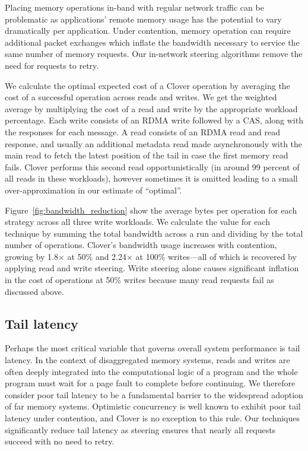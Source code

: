 Placing memory operations in-band with regular network traffic can be
problematic as applications' remote memory usage has the potential to
vary dramatically per application.  Under contention, memory operation
can require additional packet exchanges which inflate the bandwidth
necessary to service the same number of memory requests. Our
in-network steering algorithms remove the need for requests to
retry.


We calculate the optimal expected cost of a Clover operation by
averaging the cost of a successful operation across reads and
writes. We get the weighted average by multiplying the cost of a read
and write by the appropriate workload percentage. Each write consists
of an RDMA write followed by a CAS, along with the responses for each
message. A read consists of an RDMA read and read response, and
usually an additional metadata read made asynchronously with the main
read to fetch the latest position of the tail in case the first memory
read fails. Clover performs this second read opportunistically (in
around 99 percent of all reads in these workloads), however sometimes
it is omitted leading to a small over-approximation in our estimate of
``optimal''.

Figure~\ref{fig:bandwidth_reduction} show the average bytes per
operation for each strategy across all three write workloads. We
calculate the value for each technique by summing the total bandwidth
across a run and dividing by the total number of operations. Clover's
bandwidth usage increases with contention, growing by 1.8$\times$ at
50\% and 2.24$\times$ at 100\% writes---all of which is recovered by
applying read and write steering. Write steering alone causes
significant inflation in the cost of operations at 50\% writes because many
read requests fail as discussed above.

\subsection{Tail latency}

Perhaps the most critical variable that governs overall system
performance is tail latency. In the context of disaggregated memory
systems, reads and writes are often deeply integrated into the
computational logic of a program and the whole program must wait for a
page fault to complete before continuing. We therefore consider poor
tail latency to be a fundamental barrier to the widespread adoption of
far memory systems.  Optimistic concurrency is well known to exhibit
poor tail latency under contention, and Clover is no exception to this
rule. Our techniques significantly reduce tail latency as steering
ensures that nearly all requests succeed with no need to retry.

